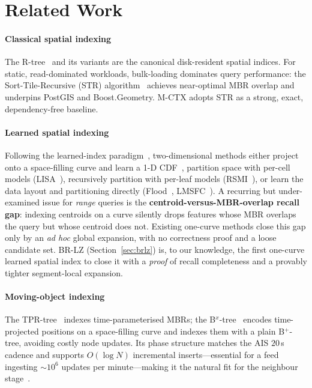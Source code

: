 \section{Related Work}\label{sec:related}

\paragraph*{Classical spatial indexing}
The R-tree~\cite{guttman1984rtree} and its variants are the canonical
disk-resident spatial indices. For static, read-dominated workloads,
bulk-loading dominates query performance: the Sort-Tile-Recursive (STR)
algorithm~\cite{leutenegger1997str} achieves near-optimal MBR overlap and
underpins PostGIS and Boost.Geometry. M-CTX adopts STR as a strong,
exact, dependency-free baseline.

\paragraph*{Learned spatial indexing}
Following the learned-index paradigm~\cite{kraska2018case}, two-dimensional
methods either project onto a space-filling curve and learn a 1-D
CDF~\cite{wang2019learnedz}, partition space with per-cell models
(LISA~\cite{li2020lisa}), recursively partition with per-leaf models
(RSMI~\cite{qi2020rsmi}), or learn the data layout and partitioning
directly (Flood~\cite{nathan2020flood}, LMSFC~\cite{gao2022lmsfc}). A
recurring but under-examined issue for \emph{range} queries is the
\textbf{centroid-versus-MBR-overlap recall gap}: indexing centroids on a
curve silently drops features whose MBR overlaps the query but whose
centroid does not. Existing one-curve methods close this gap only by an
\emph{ad hoc} global expansion, with no correctness proof and a loose
candidate set. BR-LZ (Section~\ref{sec:brlz}) is, to our knowledge, the
first one-curve learned spatial index to close it with a \emph{proof} of
recall completeness and a provably tighter segment-local expansion.

\paragraph*{Moving-object indexing}
The TPR-tree~\cite{saltenis2000tpr} indexes time-parameterised MBRs;
the B$^{x}$-tree~\cite{jensen2004bx} encodes time-projected positions on a
space-filling curve and indexes them with a plain B$^{+}$-tree, avoiding
costly node updates. Its phase structure matches the AIS $20$\,s cadence
and supports $O(\log N)$ incremental inserts---essential for a feed
ingesting $\sim\!10^{6}$ updates per minute---making it the natural fit
for the neighbour stage~\cite{moon2001hilbert}.

